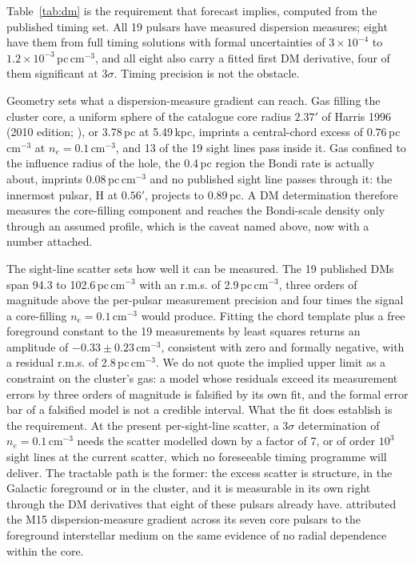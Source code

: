 \documentclass[11pt]{article}
\begin{document}
Table~\ref{tab:dm} is the requirement that forecast implies, computed from the published timing set. All 19 pulsars have measured dispersion measures; eight have them from full timing solutions with formal uncertainties of $3\times10^{-4}$ to $1.2\times10^{-3}$\,pc\,cm$^{-3}$, and all eight also carry a fitted first DM derivative, four of them significant at $3\sigma$. Timing precision is not the obstacle.

Geometry sets what a dispersion-measure gradient can reach. Gas filling the cluster core, a uniform sphere of the catalogue core radius $2.37'$ of Harris 1996 (2010 edition; \citealp{Harris2010}), or 3.78\,pc at 5.49\,kpc, imprints a central-chord excess of $0.76$\,pc\,cm$^{-3}$ at $n_{e} = 0.1\,\mathrm{cm^{-3}}$, and 13 of the 19 sight lines pass inside it. Gas confined to the influence radius of the hole, the 0.4\,pc region the Bondi rate is actually about, imprints $0.08$\,pc\,cm$^{-3}$ and no published sight line passes through it: the innermost pulsar, H at $0.56'$, projects to 0.89\,pc. A DM determination therefore measures the core-filling component and reaches the Bondi-scale density only through an assumed profile, which is the caveat named above, now with a number attached.

The sight-line scatter sets how well it can be measured. The 19 published DMs span 94.3 to 102.6\,pc\,cm$^{-3}$ with an r.m.s. of 2.9\,pc\,cm$^{-3}$, three orders of magnitude above the per-pulsar measurement precision and four times the signal a core-filling $n_{e} = 0.1\,\mathrm{cm^{-3}}$ would produce. Fitting the chord template plus a free foreground constant to the 19 measurements by least squares returns an amplitude of $-0.33 \pm 0.23\,\mathrm{cm^{-3}}$, consistent with zero and formally negative, with a residual r.m.s. of 2.8\,pc\,cm$^{-3}$. We do not quote the implied upper limit as a constraint on the cluster's gas: a model whose residuals exceed its measurement errors by three orders of magnitude is falsified by its own fit, and the formal error bar of a falsified model is not a credible interval. What the fit does establish is the requirement. At the present per-sight-line scatter, a $3\sigma$ determination of $n_{e} = 0.1\,\mathrm{cm^{-3}}$ needs the scatter modelled down by a factor of 7, or of order $10^{3}$ sight lines at the current scatter, which no foreseeable timing programme will deliver. The tractable path is the former: the excess scatter is structure, in the Galactic foreground or in the cluster, and it is measurable in its own right through the DM derivatives that eight of these pulsars already have. \citet{AndersonSB1993} attributed the M15 dispersion-measure gradient across its seven core pulsars to the foreground interstellar medium on the same evidence of no radial dependence within the core.
\end{document}
